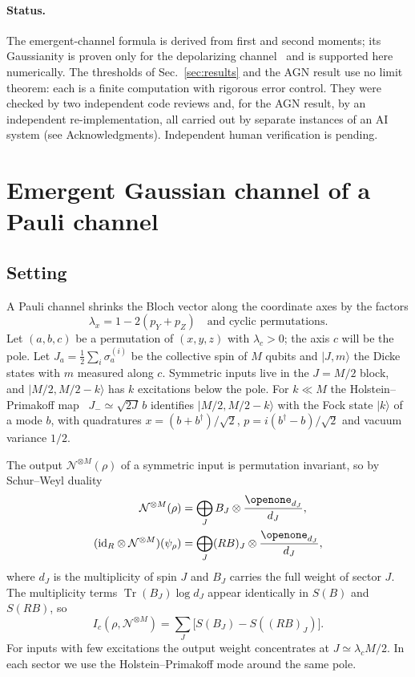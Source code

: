 \documentclass[aps,pra,reprint,superscriptaddress,nofootinbib,longbibliography,floatfix]{revtex4-2}
\theoremstyle{remark}
\newcommand{\ket}[1]{\lvert #1\rangle}
\newcommand{\Tr}{\operatorname{Tr}}
\newcommand{\id}{\mathrm{id}}
\newcommand{\one}{\openone}
\newcommand{\Ic}{I_c}
\begin{document}
\paragraph*{Status.}
The emergent-channel formula is derived from first and second moments; its Gaussianity is proven only
for the depolarizing channel~\cite{ahmed2026choir} and is supported here numerically. The thresholds
of Sec.~\ref{sec:results} and the AGN result use no limit theorem: each is a finite computation with
rigorous error control. They were checked by two independent code reviews and, for the AGN result, by
an independent re-implementation, all carried out by separate instances of an AI system
(see Acknowledgments). Independent human verification is pending.

\section{Emergent Gaussian channel of a Pauli channel}
\label{sec:emergent}

\subsection{Setting}
A Pauli channel shrinks the Bloch vector along the coordinate axes by the factors
\begin{equation}
  \lambda_x=1-2(p_Y+p_Z)\quad\text{and cyclic permutations.}
\end{equation}
Let $(a,b,c)$ be a permutation of $(x,y,z)$ with $\lambda_c>0$; the axis $c$ will be the pole. Let
$J_a=\tfrac12\sum_i\sigma_a^{(i)}$ be the collective spin of $M$ qubits and $\ket{J,m}$ the Dicke states
with $m$ measured along $c$. Symmetric inputs live in the $J=M/2$ block, and
$\ket{M/2,M/2-k}$ has $k$ excitations below the pole. For $k\ll M$ the Holstein--Primakoff
map~\cite{holstein1940} $J_-\simeq\sqrt{2J}\,b$ identifies $\ket{M/2,M/2-k}$ with the Fock state
$\ket k$ of a mode $b$, with quadratures $x=(b+b^\dagger)/\sqrt2$, $p=i(b^\dagger-b)/\sqrt2$ and vacuum
variance $1/2$.

The output $\mathcal N^{\otimes M}(\rho)$ of a symmetric input is permutation invariant, so by
Schur--Weyl duality
\begin{equation}
\begin{split}
  \mathcal N^{\otimes M}(\rho)&=\bigoplus_J B_J\otimes\frac{\one_{d_J}}{d_J},\\
  (\id_R\otimes\mathcal N^{\otimes M})(\psi_\rho)&=\bigoplus_J (RB)_J\otimes\frac{\one_{d_J}}{d_J},
\end{split}
  \label{eq:schurweyl}
\end{equation}
where $d_J$ is the multiplicity of spin $J$ and $B_J$ carries the full weight of sector $J$. The
multiplicity terms $\Tr(B_J)\log d_J$ appear identically in $S(B)$ and $S(RB)$, so
\begin{equation}
  \Ic(\rho,\mathcal N^{\otimes M})=\sum_J\bigl[S(B_J)-S((RB)_J)\bigr].
  \label{eq:blockIc}
\end{equation}
For inputs with few excitations the output weight concentrates at $J\simeq\lambda_cM/2$. In each sector
we use the Holstein--Primakoff mode around the same pole.
\end{document}
